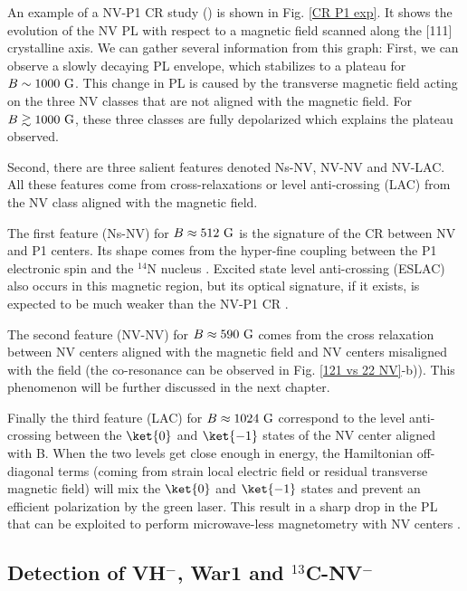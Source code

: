 \documentclass[a4paper, 11pt]{report}
\begin{document}
An example of a NV-P1 CR study (\citep{armstrong2010nv}) is shown in Fig. \ref{CR P1 exp}. It shows the evolution of the NV PL with respect to a magnetic field scanned along the [111] crystalline axis. We can gather several information from this graph: First, we can observe a slowly decaying PL envelope, which stabilizes to a plateau for $B\sim 1000\ \rm G$. This change in PL is caused by the transverse magnetic field acting on the three NV classes that are not aligned with the magnetic field. For $B \gtrsim 1000\ \rm G$, these three classes are fully depolarized which explains the plateau observed.

Second, there are three salient features denoted Ns-NV, NV-NV and NV-LAC. All these features come from cross-relaxations or level anti-crossing (LAC) from the NV class aligned with the magnetic field.

The first feature (Ns-NV) for $B\approx 512 \ \rm G$ is the signature of the CR between NV and P1 centers. Its shape comes from the hyper-fine coupling between the P1 electronic spin and the $^{14}$N nucleus \citep{lazda2021cross}. Excited state level anti-crossing (ESLAC) also occurs in this magnetic region, but its optical signature, if it exists, is expected to be much weaker than the NV-P1 CR \citep{zheng2017level}.

The second feature (NV-NV) for $B\approx 590 \ \rm G$ comes from the cross relaxation between NV centers aligned with the magnetic field and NV centers misaligned with the field (the co-resonance can be observed in Fig. \ref{121 vs 22 NV}-b)). This phenomenon will be further discussed in the next chapter.

Finally the third feature (LAC) for $B\approx 1024 \ \rm G$ correspond to the level anti-crossing between the $\ket{0}$ and $\ket{-1}$ states of the NV center aligned with B. When the two levels get close enough in energy, the Hamiltonian off-diagonal terms (coming from strain local electric field or residual transverse magnetic field) will mix the $\ket{0}$ and $\ket{-1}$ states and prevent an efficient polarization by the green laser. This result in a sharp drop in the PL that can be exploited to perform microwave-less magnetometry with NV centers \citep{wickenbrock2016microwave, zheng2017level, zheng2020microwave}.

\subsection{Detection of VH$^-$, War1 and $^{13}$C-NV$^-$}
\end{document}
